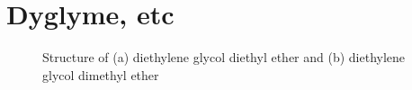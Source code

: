 \section{Dyglyme, etc}
\begin{figure}%
\centering
\vspace{1cm}
\label{fig:dgde1}
\quad
{}\label{fig:dgde2}
\vspace{1cm}
\caption{Structure of (a) diethylene glycol diethyl ether and (b) diethylene glycol dimethyl ether}\label{fig:dgde}
\end{figure}






